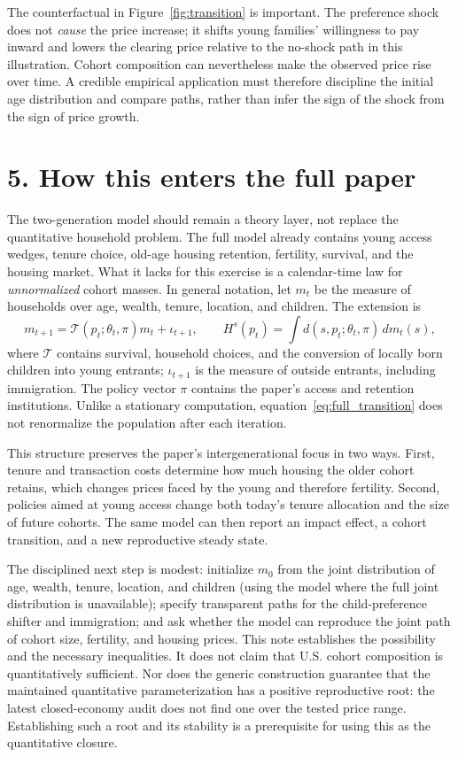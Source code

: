 \documentclass[11pt]{article}
\begin{document}
The counterfactual in Figure~\ref{fig:transition} is important. The preference
shock does not \emph{cause} the price increase; it shifts young families'
willingness to pay inward and lowers the clearing price relative to the
no-shock path in this illustration. Cohort composition can
nevertheless make the observed price rise over time. A credible empirical
application must therefore discipline the initial age distribution and compare
paths, rather than infer the sign of the shock from the sign of price growth.

\section*{5. How this enters the full paper}

The two-generation model should remain a theory layer, not replace the
quantitative household problem. The full model already contains young access
wedges, tenure choice, old-age housing retention, fertility, survival, and the
housing market. What it lacks for this exercise is a calendar-time law for
\emph{unnormalized} cohort masses. In general notation, let $m_t$ be the measure
of households over age, wealth, tenure, location, and children. The extension is
\begin{equation}
 m_{t+1}=\mathcal T(p_t;\theta_t,\pi)m_t+\iota_{t+1},
 \qquad
 H^s(p_t)=\int d(s,p_t;\theta_t,\pi)\,dm_t(s),
 \label{eq:full_transition}
\end{equation}
where $\mathcal T$ contains survival, household choices, and the conversion of
locally born children into young entrants; $\iota_{t+1}$ is the measure of
outside entrants, including immigration. The policy vector $\pi$ contains the
paper's access and retention institutions. Unlike a stationary computation,
equation~\eqref{eq:full_transition} does not renormalize the population after
each iteration.

This structure preserves the paper's intergenerational focus in two ways.
First, tenure and transaction costs determine how much housing the older cohort
retains, which changes prices faced by the young and therefore fertility.
Second, policies aimed at young access change both today's tenure allocation
and the size of future cohorts. The same model can then report an impact effect,
a cohort transition, and a new reproductive steady state.

The disciplined next step is modest: initialize $m_0$ from the joint
distribution of age, wealth, tenure, location, and children (using the model
where the full joint distribution is unavailable); specify transparent paths
for the child-preference shifter and immigration; and ask whether the model can
reproduce the joint path of cohort size, fertility, and housing prices. This
note establishes the possibility and the necessary inequalities. It does not
claim that U.S. cohort composition is quantitatively sufficient. Nor does the
generic construction guarantee that the maintained quantitative
parameterization has a positive reproductive root: the latest closed-economy
audit does not find one over the tested price range. Establishing such a root
and its stability is a prerequisite for using this as the quantitative closure.
\end{document}
